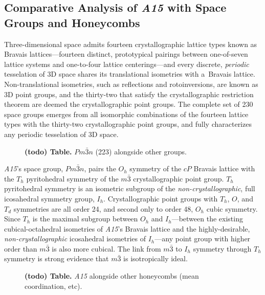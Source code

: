 \documentclass[10pt]{article}
\def\AAAB{\textit{A15}}
\begin{document}
\subsection{ Comparative Analysis of \AAAB{} with Space Groups and Honeycombs
}\label{comparative-analysis-of-a15-space-groups-and-honeycombs}

Three-dimensional space admits fourteen crystallographic lattice types known as Bravais lattices---fourteen distinct,
prototypical pairings between one-of-seven lattice systems and one-to-four lattice centerings---and every discrete,
\emph{periodic} tesselation of 3D space shares its translational isometries with a~Bravais lattice. Non-translational isometries,
such as reflections and rotoinversions, are known as 3D point groups, and the thirty-two that satisfy the crystallographic
restriction theorem are deemed the crystallographic point groups. The complete set of 230 space groups emerges from all
isomorphic combinations of the fourteen lattice types with the thirty-two crystallographic point groups, and fully characterizes
any periodic tesselation of 3D space.

\begin{figure}[!ht]\textbf{(todo) Table.} $Pm\bar{3}n$ (223) alongside other groups.\end{figure}

\AAAB{}'s space group, $Pm\bar{3}n$, pairs the $O_h$ symmetry of the $cP$ Bravais lattice with the $T_h$ pyritohedral symmetry of
the $m\bar{3}$ crystallographic point group. $T_h$ pyritohedral symmetry is an isometric subgroup of the
\emph{non-crystallographic}, full icosahedral symmetry group, $I_h$. Crystallographic point groups with $T_h$, $O$, and $T_d$
symmetries are all order 24, and second only to order 48, $O_h$ cubic symmetry. Since $T_h$ is the maximal subgroup between $O_h$
and $I_h$---between the existing cubical-octahedral isometries of \AAAB{}'s Bravais lattice and the highly-desirable,
\emph{non-crystallographic} icosahedral isometries of $I_h$---any point group with higher order than $m\bar{3}$ is also more
cubical. The link from $m\bar{3}$ to $I_h$ symmetry through $T_h$ symmetry is strong evidence that $m\bar{3}$ is isotropically
ideal.

\begin{figure}[!ht]\textbf{(todo) Table.} \AAAB{} alongside other honeycombs (mean coordination, etc).\end{figure}
\end{document}

